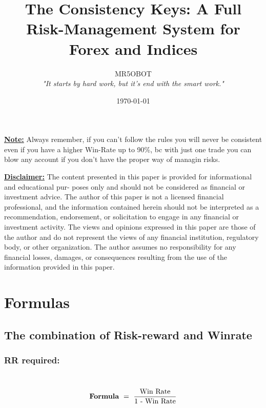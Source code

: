\documentclass[10pt] {article}
\title{The Consistency Keys: A  Full Risk-Management System for Forex and Indices}
\author{MR5OBOT \\ \textit{"It starts by hard work, but it's end with the smart work."}}
\begin{document}
\date{\today}
\maketitle

\tableofcontents  

\vspace{20pt} %

\noindent \textbf{\underline{Note:}}
\small{Always remember, if you can't follow the rules you will never be consistent even if you have a higher Win-Rate up to 90\%, bc with just one trade you can blow any account if you don't have the proper way of managin risks.
} 
\vspace{15pt} %

\noindent \textbf{\underline{Disclaimer:}}
\small{The content presented in this paper is provided for informational and educational pur-
poses only and should not be considered as financial or investment advice. The author of this paper is
not a licensed financial professional, and the information contained herein should not be interpreted as
a recommendation, endorsement, or solicitation to engage in any financial or investment activity. The
views and opinions expressed in this paper are those of the author and do not represent the views of
any financial institution, regulatory body, or other organization. The author assumes no responsibility
for any financial losses, damages, or consequences resulting from the use of the information provided
in this paper.}
\newpage
\section{Formulas}

\subsection{The combination of Risk-reward and Winrate}

\subsubsection{RR required:} \
\[ \text{\textbf{Formula}}\ =\ \frac{\text{Win Rate}}{\text{1}\text{ - Win Rate}} \] \
\end{document}
